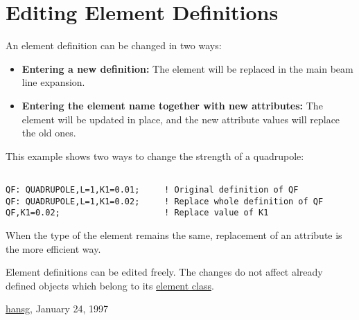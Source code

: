 




\section{Editing Element Definitions}  An element definition can be changed in two ways: 
\begin{itemize}
	\item \textbf{Entering a new definition:} The element will be replaced in the main beam line expansion. 
	\item \textbf{Entering the element name together with new attributes:} The element will be updated in place, and the new attribute values will replace the old ones. 
\end{itemize} This example shows two ways to change the strength of a quadrupole: 
\begin{verbatim}

QF: QUADRUPOLE,L=1,K1=0.01;     ! Original definition of QF
QF: QUADRUPOLE,L=1,K1=0.02;     ! Replace whole definition of QF
QF,K1=0.02;                     ! Replace value of K1
\end{verbatim} When the type of the element remains the same, replacement of an attribute is the more efficient way. 

 Element definitions can be edited freely. The changes do not affect already defined objects which belong to its \href{elm_class.html}{element class}. 

\href{http://www.cern.ch/Hans.Grote/hansg_sign.html}{hansg}, January 24, 1997 

